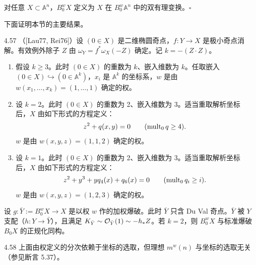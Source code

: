 对任意 $X\subset\mathbb{A}^n$，$B_0^wX$ 定义为 $X$ 在 $B_0^w\mathbb{A}^n$ 中的双有理变换。\hfill$\square$

下面证明本节的主要结果。

\begin{theorem*}{4.57}
（[Lau77, Rei76]）设 $(0\in X)$ 是二维椭圆奇点，$f:Y\to X$ 是极小奇点消解。有效例外除子 $Z$ 由 $\omega_Y=f^*\omega_X(-Z)$ 确定。记 $k=-(Z\cdot Z)$。
\begin{enumerate}[label=(\arabic*),leftmargin=2.4em,itemsep=1pt,topsep=2pt]
\item 假设 $k\ge 3$。此时 $(0\in X)$ 的重数为 $k$、嵌入维数为 $k$。任取嵌入 $(0\in X)\hookrightarrow(0\in\mathbb{A}^k)$，$x_i$ 是 $\mathbb{A}^k$ 的坐标系，$w$ 是由 $w(x_1,\dots,x_k)=(1,\dots,1)$ 确定的权。
\item 设 $k=2$。此时 $(0\in X)$ 的重数为 2、嵌入维数为 3。适当重取解析坐标后，$X$ 由如下形式的方程定义：
\[ z^2+q(x,y)=0\qquad(\operatorname{mult}_0q\ge4). \]
$w$ 是由 $w(x,y,z)=(1,1,2)$ 确定的权。
\item 设 $k=1$。此时 $(0\in X)$ 的重数为 2、嵌入维数为 3。适当重取解析坐标后，$X$ 由如下形式的方程定义：
\[ z^2+y^3+yq_4(x)+q_6(x)=0\qquad(\operatorname{mult}_0q_i\ge i). \]
$w$ 是由 $w(x,y,z)=(1,2,3)$ 确定的权。
\end{enumerate}
设 $g:\bar Y:=B_0^wX\to X$ 是以权 $w$ 作的加权爆破。此时 $\bar Y$ 只含 Du Val 奇点。$\bar Y$ 被 $Y$ 支配（$h:Y\to\bar Y$），且满足 $K_{\bar Y}\sim\mathcal{O}_{\bar Y}(1)\sim-h_*Z$。若 $k=2$，则 $B_0^wX$ 与标准爆破 $B_0X$ 的正规化同构。
\end{theorem*}

\begin{remark}{4.58}
上面由权定义的分次依赖于坐标的选取，但理想 $m^w(n)$ 与坐标的选取无关（参见断言 5.37）。
\end{remark}

